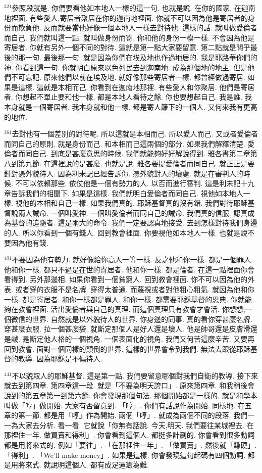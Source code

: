 \documentclass{book}
\begin{document}
$^{321}$參照段就是.
你們要看他如本地人一樣的這一句.
也就是說.
在你的國家.
在迦南地裡面.
有些愛人,寄居者聚居在你的迦南地裡面.
你就不可以因為他是寄居者的身份而欺負他.
反而就要當他好像一個本地人一樣去對待他.
這樣的話.
就叫做愛倫者而自己.
我們就叫這一點.
就叫做身份而寄.
你和他的身份一模一樣.
不會因為他是寄居者.
你就有另外一個不同的對待.
這就是第一點大家要留意.
第二點就是關乎最後的那一句.
最後那一句.
就是因為你們在埃及地也作過地居的.
我是耶路華你們的神.
你看到這一句.
你就明白原來以色列民去到迦南地.
成為那個地的地主.
但是他們不可忘記.
原來他們以前在埃及地.
就好像那些寄居者一樣.
都曾經做過寄居.
如果是這樣.
這就是本相而己.
你看到在迦南地那裡.
有些愛人和你聚居.
他們是寄居者.
你想起不單止要和他一樣.
都是本地人看待之餘.
你也要想起自己.
我是誰.
我本身就是一個寄居者.
我本身就和他一樣.
都是寄人籬下的一個人.
又何來我有更高的地位.

$^{361}$去對他有一個差別的對待呢.
所以這就是本相而己.
所以愛人而己.
又或者愛倫者而同自己的原則.
就是身份而己.
和本相而己這兩個的部分.
如果我們解釋清楚.
愛倫者而同自己.
到底是甚麼意思的時候.
我們就能夠好好解說得到.
雅各書第二章第八到第九節.
在這裡說的是甚麼.
也就是說.
雅各要提愛倫者而同自己.
就正正是要針對憑外貌待人.
因為利未記已經告訴你.
憑外貌對人的壞處.
就是在審判人的時候.
不可以依賴那些.
依仗他是一個有勢力的人.
以否而進行審判.
這是利未記十九章告訴我們的相聞下.
如果是這樣.
我們就明白愛倫者而同自己.
視他如本地人一樣.
視他的本相和自己一樣.
如果我們真的.
耶穌基督真的沒有錯.
我們對待耶穌基督說兩大誡命.
一個叫愛神.
一個叫愛倫者而同自己的誡命.
我們真的信服.
認真成為基督的追隨者.
這是兩大的命令.
我們一定要認真地接受.
去到怎樣對待我們身邊的人.
所以你看到一個有錢人.
回到教會裡面.
你要視他如本地人一樣.
也就是說不要因為他有錢.

$^{401}$不要因為他有勢力.
就好像給你高人一等一樣.
反之他和你一樣.
都是一個罪人.
他和你一樣.
都只不過是在世的寄居者.
他和你一樣.
都是倫者.
在這一點裡面你會看得到.
另外那邊相.
如果你看到一個貧窮人.
回到教會裡面.
你不可以因為他的外表.
或者穿的衣服不是名牌.
穿得太普通.
而蔑視或者對他粗心粗氣.
就因為他和你一樣.
都是寄居者.
和你一樣都是罪人.
和你一樣.
都需要耶穌基督的恩典.
你就能夠在教會裡面.
活出愛倫者與自己的真理.
而這個真理只有教會才會活.
你想想,一個微信的世界.
自然就是以外貌待人的世界.
你身邊的同事.
真的看你穿甚麼名牌.
穿甚麼衣服.
拉一個甚麼袋.
就斷定那個人是好人還是壞人.
他是帥哥還是皮膚滑還是鹹.
是斷定他人格的一個視角.
一個表面化的視角.
我們又何苦這麼辛苦.
又要再回到教會.
面對一個同樣的顛倒的世界.
這樣的世界會令到我們.
無法去跟從耶穌基督的教導.
因為耶穌是不偏待人.

$^{441}$不以貌取人的耶穌基督.
這是第一點.
我們要留意哪個對我們自衛的教導.
接下來就去到第四章.
第四章這一段.
就是「不要為明天誇口」.
原來第四章.
和我稍後會說到的第五章第一到第六節.
你會發現那個句法.
那個開始都是一樣的.
就是和學本叫做「哼」做開始.
大家有否留意到.
「哼」.
你們有話說作為開始.
同樣地.
在五章的第一節.
都是用「哼」作為開始.
兩個「哼」.
就成為兩個不同的段落.
我們一一為大家去分析.
看一看.
它就說「你無有話說.
今天,明天.
我們要往某城裡去.
在那裡住一年.
做買賣和得利」.
你會看到這個人.
都挺多計劃的.
你會看到很多動詞都是用將來式的.
例如「要往」.
「在那裡住一年」.
「做買賣」.
然後就「賺硬」.
「得利」.
「We'll make money」.
如果是這樣.
你會發現這句起碼有四個動詞.
都是用將來式.
就說明這個人.
都有成足運籌為難.
\end{document}
